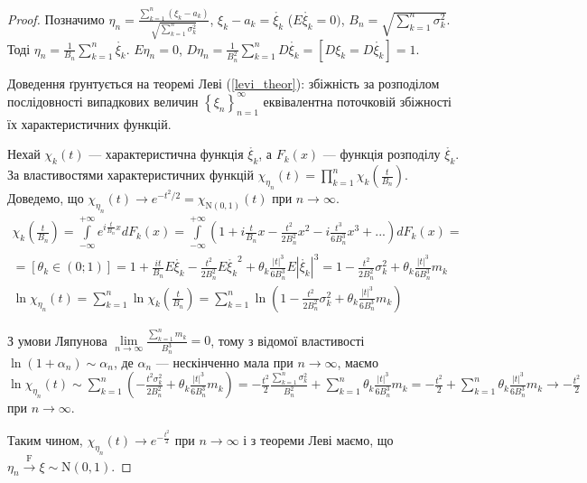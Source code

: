 \begin{proof}
    Позначимо $\eta_n = \frac{\sum\limits_{k=1}^n (\xi_k - a_k)}
    {\sqrt{\sum\limits_{k=1}^n \sigma_k^2}}$, $\xi_k - a_k = \mathring{\xi_k}$ ($E\mathring{\xi_k} = 0)$, 
    $B_n = \sqrt{\sum\limits_{k=1}^n \sigma_k^2}$. 
    Тоді $\eta_n = \frac{1}{B_n}\sum\limits_{k=1}^n \mathring{\xi_k}$.
    $E\eta_n = 0$, $D\eta_n = \frac{1}{B_n^2}\sum\limits_{k=1}^n D\mathring{\xi_k} = 
    \left[D\xi_k = D\mathring{\xi_k}\right] = 1$.

    Доведення ґрунтується на теоремі Леві (\ref{levi_theor}): збіжність за розподілом послідовності 
    випадкових величин $\left\{ \xi_n\right\}_{n=1}^{\infty}$ еквівалентна поточковій збіжності їх
    характеристичних функцій.

    Нехай $\chi_k(t)$ --- характеристична функція $\mathring{\xi_k}$, а $F_k(x)$ --- 
    функція розподілу $\mathring{\xi_k}$.
    За властивостями характеристичних функцій $\chi_{\eta_n}(t) = 
    \prod\limits_{k=1}^n \chi_k(\frac{t}{B_n})$. 
    Доведемо, що $\chi_{\eta_n}(t)\to e^{-t^2/2} = 
    \chi_{\mathrm{N}(0, 1)}(t)$ при $ n \to \infty$.
    \begin{gather*}\chi_k\left(\frac{t}{B_n}\right) = \int\limits_{-\infty}^{+\infty} e^{i\frac{t}{B_n}x} dF_k(x) = 
    \int\limits_{-\infty}^{+\infty} \left(1 + i\frac{t}{B_n}x - \frac{t^2}{2B_n^2}x^2 - 
    i\frac{t^3}{6B_n^3}x^3 + ...\right) dF_k(x) = \\ = \left[\theta_k \in (0; 1)\right]
    = 1 + \frac{it}{B_n}E\mathring{\xi_k} - \frac{t^2}{2B_n^2}
    E\mathring{\xi_k}^2 + \theta_k\frac{|t|^3}{6B_n^3}E|\mathring{\xi_k}|^3 = 
    1 - \frac{t^2}{2B_n^2}\sigma_k^2 + \theta_k\frac{|t|^3}{6B_n^3}m_k \\
    \ln\chi_{\eta_n}(t) = \sum\limits_{k=1}^n \ln \chi_k \left(\frac{t}{B_n}\right) = 
    \sum\limits_{k=1}^n \ln\left(1 - \frac{t^2}{2B_n^2}\sigma_k^2 + 
    \theta_k\frac{|t|^3}{6B_n^3}m_k\right)
    \end{gather*}

    З умови Ляпунова $\underset{n \rightarrow \infty}{\lim} \frac{\sum\limits_{k=1}^n m_k}{B_n^3} = 0$, 
    тому з відомої властивості $\ln(1 + \alpha_n) \sim \alpha_n$, де $\alpha_n$ --- нескінченно мала при 
    $n \rightarrow \infty$, маємо $\ln\chi_{\eta_n}(t) \sim \sum\limits_{k=1}^n\left(
        -\frac{t^2\sigma^2_k}{2B_n^2} + \theta_k\frac{|t|^3}{6B_n^3}m_k
    \right) 
    = -\frac{t^2}{2}\frac{\sum\limits_{k=1}^n\sigma_k^2}{B_n^2} + \sum\limits_{k=1}^n \theta_k\frac{|t|^3}{6B_n^3}m_k= -\frac{t^2}{2} 
    + \sum\limits_{k=1}^n \theta_k\frac{|t|^3}{6B_n^3}m_k \to -\frac{t^2}{2} 
    $ при $n \rightarrow \infty$.
    
    Таким чином, $\chi_{\eta_n}(t) \to e^{-\frac{t^2}{2}}$ при $n \rightarrow \infty$ і 
    з теореми Леві маємо, що $\eta_n \overset{\mathrm{F}}{\longrightarrow} \xi \sim \mathrm{N}(0, 1)$.
\end{proof}
